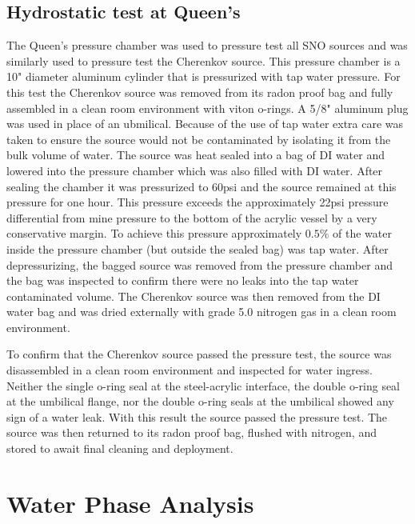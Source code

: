 \subsection{Hydrostatic test at Queen's}

\begin{figure}
\centering
\caption{}
\label{fig:pressurechamber}
\end{figure}

The Queen's pressure chamber was used to pressure test all SNO sources and was similarly used to pressure test the Cherenkov source. This pressure chamber is a 10" diameter aluminum cylinder that is pressurized with tap water pressure. For this test the Cherenkov source was removed from its radon proof bag and fully assembled in a clean room environment with viton o-rings. A 5/8" aluminum plug was used in place of an ubmilical. Because of the use of tap water extra care was taken to ensure the source would not be contaminated by isolating it from the bulk volume of water. The source was heat sealed into a bag of DI water and lowered into the pressure chamber which was also filled with DI water. After sealing the chamber it was pressurized to 60psi and the source remained at this pressure for one hour. This pressure exceeds the approximately 22psi pressure differential from mine pressure to the bottom of the acrylic vessel by a very conservative margin. To achieve this pressure approximately $0.5\%$ of the water inside the pressure chamber (but outside the sealed bag) was tap water. After depressurizing, the bagged source was removed from the pressure chamber and the bag was inspected to confirm there were no leaks into the tap water contaminated volume. The Cherenkov source was then removed from the DI water bag and was dried externally with grade 5.0 nitrogen gas in a clean room environment. 

To confirm that the Cherenkov source passed the pressure test, the source was disassembled in a clean room environment and inspected for water ingress. Neither the single o-ring seal at the steel-acrylic interface, the double o-ring seal at the umbilical flange, nor the double o-ring seals at the umbilical showed any sign of a water leak. With this result the source passed the pressure test. The source was then returned to its radon proof bag, flushed with nitrogen, and stored to await final cleaning and deployment.

\section{Water Phase Analysis}
\label{chap:water_phase}


